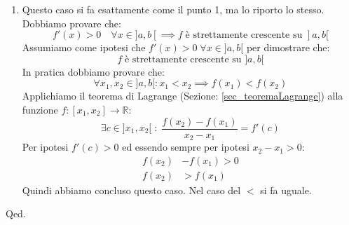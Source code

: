 {\begin{enumerate}
			Caso $\impliedby$: In questo caso l'uso diretto del teorema di 
            Lagrange non permette di concludere quello che vogliamo dimostrare, 
            infatti non riuscirei a dimostrare la cosa per tutti i punti. 
            Dobbiamo provare che:
			\begin{equation*}
				f \; \text{è una funzione crescente su } ]a,b[ \implies 
                \forall x \in ]a, b[ \; f'(x) \geq 0 
			\end{equation*}
			Assumiamo che $f$ sia crescente su $]a,b[$ per dimostrare:
			\begin{equation*}
				f'(x) \geq 0 \quad \forall x \in ]a, b[
			\end{equation*}
			Essendo crescente:
			\begin{equation*}
				\forall x_0 \in ]a,b[ : x > x_0 \implies f(x) \geq f(x_0)
			\end{equation*}
			Visto che $x - x_0 > 0$ e $f(x) - f(x_0) \geq 0$, ne consegue:
			\begin{equation*}
				\dfrac{f(x) - f(x_0)}{x - x_0} \geq 0
			\end{equation*}
			Essendo per ipotesi derivabile e dal teorema di permanenza del 
            segno (Sezione: \ref{theorem_permanenzaSegno}):
			\begin{equation*}
				f'(x_0) = \lim_{x \to x_0} \dfrac{f(x) - f(x_0)}{x - x_0} 
                \geq 0
			\end{equation*}
			E questo vale $\forall x_0 \in ]a,b[$, quindi abbiamo finito.

		\item Questo caso si fa esattamente come il punto 1, ma lo riporto lo 
            stesso. Dobbiamo provare che:
			\begin{equation*}
				f'(x) > 0 \quad \forall x \in ]a,b[ \implies f \; \text{è 
                strettamente crescente su } ]a,b[
			\end{equation*}
			Assumiamo come ipotesi che  $f'(x) > 0 \; \forall x \in ]a,b[$ 
        per dimostrare che:
			\begin{equation*}
				f \; \text{è strettamente crescente su } ]a,b[
			\end{equation*}
			In pratica dobbiamo provare che:
			\begin{equation*}
				\forall x_1, x_2 \in ]a,b[ : x_1 < x_2 \implies f(x_1) < f(x_2)
			\end{equation*}
			Applichiamo il teorema di Lagrange (Sezione: 
            \ref{sec_teoremaLagrange}) alla funzione $f:[x_1, x_2] \to 
            \mathbb{R}$:
			\begin{equation*}
				\exists c \in ]x_1, x_2[ \; : \; \dfrac{f(x_2) - f(x_1)}{x_2 - 
                x_1} = f'(c)
			\end{equation*}
			Per ipotesi $f'(c) > 0$ ed essendo sempre per ipotesi $x_2 - x_1 > 
            0$:
			\begin{align*}
				f(x_2) &- f(x_1) > 0\\[10pt]
				f(x_2) &> f(x_1)
			\end{align*}
			Quindi abbiamo concluso questo caso. Nel caso del $<$ si fa 
            uguale.\\
	\end{enumerate}
	\hfill Qed.
}

